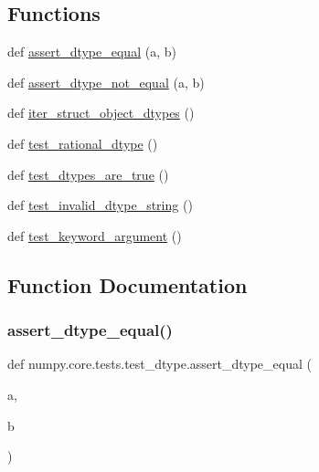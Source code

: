 \subsection*{Functions}
\begin{DoxyCompactItemize}
\item 
def \hyperlink{namespacenumpy_1_1core_1_1tests_1_1test__dtype_a0fbe7fa8da22e4895ee1a0b5464e5ecf}{assert\+\_\+dtype\+\_\+equal} (a, b)
\item 
def \hyperlink{namespacenumpy_1_1core_1_1tests_1_1test__dtype_a982cd03238b15965a274b3d847a17be5}{assert\+\_\+dtype\+\_\+not\+\_\+equal} (a, b)
\item 
def \hyperlink{namespacenumpy_1_1core_1_1tests_1_1test__dtype_ac392716bb7898c2e2614acd393cb4e7b}{iter\+\_\+struct\+\_\+object\+\_\+dtypes} ()
\item 
def \hyperlink{namespacenumpy_1_1core_1_1tests_1_1test__dtype_ad5f6d4355e7b746b5fc0c762e602af7b}{test\+\_\+rational\+\_\+dtype} ()
\item 
def \hyperlink{namespacenumpy_1_1core_1_1tests_1_1test__dtype_a8e025633ae43998685cc83658bb7c269}{test\+\_\+dtypes\+\_\+are\+\_\+true} ()
\item 
def \hyperlink{namespacenumpy_1_1core_1_1tests_1_1test__dtype_ac05897844f2c7cc836ba6335e5b97de5}{test\+\_\+invalid\+\_\+dtype\+\_\+string} ()
\item 
def \hyperlink{namespacenumpy_1_1core_1_1tests_1_1test__dtype_a2df35354f913102df1a4ef24573351fb}{test\+\_\+keyword\+\_\+argument} ()
\end{DoxyCompactItemize}


\subsection{Function Documentation}
\mbox{\label{namespacenumpy_1_1core_1_1tests_1_1test__dtype_a0fbe7fa8da22e4895ee1a0b5464e5ecf}} 
\subsubsection{\texorpdfstring{assert\+\_\+dtype\+\_\+equal()}{assert\_dtype\_equal()}}
{\footnotesize\ttfamily def numpy.\+core.\+tests.\+test\+\_\+dtype.\+assert\+\_\+dtype\+\_\+equal (\begin{DoxyParamCaption}\item[{}]{a,  }\item[{}]{b }\end{DoxyParamCaption})}

